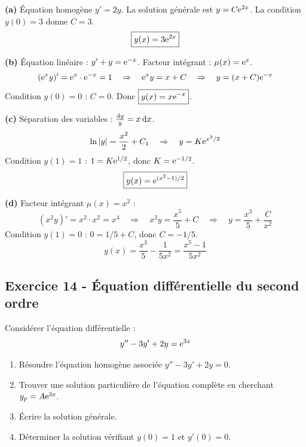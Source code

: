 \documentclass[12pt,a4paper]{article}
\begin{document}
\begin{boitecorrige}
\textbf{(a)} Équation homogène $y' = 2y$. La solution générale est $y = C\mathrm{e}^{2x}$. La condition $y(0) = 3$ donne $C = 3$.
\[
\boxed{y(x) = 3\mathrm{e}^{2x}}
\]

\textbf{(b)} Équation linéaire : $y' + y = \mathrm{e}^{-x}$. Facteur intégrant : $\mu(x) = \mathrm{e}^x$.
\[
(\mathrm{e}^x y)' = \mathrm{e}^x\cdot\mathrm{e}^{-x} = 1 \quad \Rightarrow \quad \mathrm{e}^x y = x + C \quad \Rightarrow \quad y = (x+C)\mathrm{e}^{-x}
\]
Condition $y(0) = 0$ : $C = 0$. Donc $\boxed{y(x) = x\mathrm{e}^{-x}}$.

\textbf{(c)} Séparation des variables : $\frac{\mathrm{d} y}{y} = x\,\mathrm{d} x$.
\[
\ln|y| = \frac{x^2}{2} + C_1 \quad \Rightarrow \quad y = K\mathrm{e}^{x^2/2}
\]
Condition $y(1) = 1$ : $1 = K\mathrm{e}^{1/2}$, donc $K = \mathrm{e}^{-1/2}$.
\[
\boxed{y(x) = \mathrm{e}^{(x^2-1)/2}}
\]

\textbf{(d)} Facteur intégrant $\mu(x) = x^2$ :
\[
(x^2 y)' = x^2 \cdot x^2 = x^4 \quad \Rightarrow \quad x^2 y = \frac{x^5}{5} + C \quad \Rightarrow \quad y = \frac{x^3}{5} + \frac{C}{x^2}
\]
Condition $y(1) = 0$ : $0 = 1/5 + C$, donc $C = -1/5$.
\[
\boxed{y(x) = \frac{x^3}{5} - \frac{1}{5x^2} = \frac{x^5 - 1}{5x^2}}
\]
\end{boitecorrige}

\subsection*{Exercice 14 - Équation différentielle du second ordre \niveau{\difficile}}

\begin{boiteexercice}
Considérer l'équation différentielle :
\[
y'' - 3y' + 2y = \mathrm{e}^{3x}
\]
\begin{enumerate}
  \item Résoudre l'équation homogène associée $y'' - 3y' + 2y = 0$.
  \item Trouver une solution particulière de l'équation complète en cherchant $y_p = A\mathrm{e}^{3x}$.
  \item Écrire la solution générale.
  \item Déterminer la solution vérifiant $y(0) = 1$ et $y'(0) = 0$.
\end{enumerate}
\end{boiteexercice}
\end{document}
